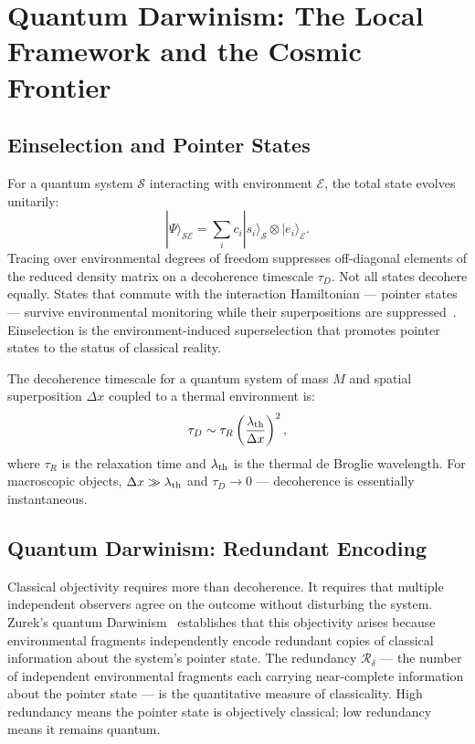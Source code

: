 \documentclass[12pt,a4paper]{article}
\begin{document}
\section{Quantum Darwinism: The Local Framework and the Cosmic Frontier}
\label{sec:zurek}

\subsection{Einselection and Pointer States}

For a quantum system $\mathcal{S}$ interacting with environment $\mathcal{E}$,
the total state evolves unitarily:
\begin{equation}
|\Psi\rangle_{\mathcal{SE}} = \sum_i c_i |s_i\rangle_\mathcal{S}
\otimes |e_i\rangle_\mathcal{E}.
\label{eq:entanglement}
\end{equation}
Tracing over environmental degrees of freedom suppresses off-diagonal elements
of the reduced density matrix on a decoherence timescale $\tau_D$. Not all
states decohere equally. States that commute with the interaction Hamiltonian
--- pointer states --- survive environmental monitoring while their
superpositions are suppressed~\citep{Zurek1981}. Einselection is the
environment-induced superselection that promotes pointer states to the status
of classical reality.

The decoherence timescale for a quantum system of mass $M$ and spatial
superposition $\Delta x$ coupled to a thermal environment is:
\begin{equation}
\tau_D \sim \tau_R \left(\frac{\lambda_{\rm th}}{\Delta x}\right)^2,
\label{eq:tau_zurek}
\end{equation}
where $\tau_R$ is the relaxation time and $\lambda_{\rm th}$ is the thermal
de Broglie wavelength. For macroscopic objects, $\Delta x \gg \lambda_{\rm
th}$ and $\tau_D \to 0$ --- decoherence is essentially instantaneous.

\subsection{Quantum Darwinism: Redundant Encoding}

Classical objectivity requires more than decoherence. It requires that
multiple independent observers agree on the outcome without disturbing the
system. Zurek's quantum Darwinism~\citep{Zurek2009} establishes that this
objectivity arises because environmental fragments independently encode
redundant copies of classical information about the system's pointer state.
The redundancy $\mathcal{R}_\delta$ --- the number of independent environmental
fragments each carrying near-complete information about the pointer state ---
is the quantitative measure of classicality. High redundancy means the pointer
state is objectively classical; low redundancy means it remains quantum.
\end{document}
